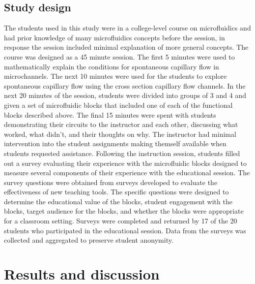 \subsection{Study design}
The students used in this study were in a college-level course on microfluidics and had prior knowledge of many microfluidics concepts before the session, in response the session included minimal explanation of more general concepts. The course was designed as a 45 minute session. The first 5 minutes were used to mathematically explain the conditions for spontaneous capillary flow in microchannels. The next 10 minutes were used for the students to explore spontaneous capillary flow using the cross section capillary flow channels. In the next 20 minutes of the session, students were divided into groups of 3 and 4 and given a set of microfluidic blocks that included one of each of the functional blocks described above. The final 15 minutes were spent with students demonstrating their circuits to the instructor and each other, discussing what worked, what didn't, and their thoughts on why. The instructor had minimal intervention into the student assignments making themself available when students requested assistance. 
Following the instruction session, students filled out a survey evaluating their experience with the microfluidic blocks designed to measure several components of their experience with the educational session. The survey questions were obtained from surveys developed to evaluate the effectiveness of new teaching tools. The specific questions were designed to determine the educational value of the blocks, student engagement with the blocks, target audience for the blocks, and whether the blocks were appropriate for a classroom setting. Surveys were completed and returned by 17 of the 20 students who participated in the educational session. Data from the surveys was collected and aggregated to preserve student anonymity.

\section{Results and discussion}

